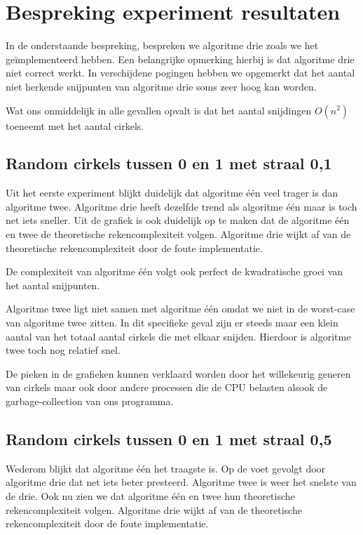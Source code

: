 \documentclass[11pt,a4paper]{article}
\begin{document}
\section{Bespreking experiment resultaten}

In de onderstaande bespreking, bespreken we algoritme drie zoals we het ge\"implementeerd hebben. Een belangrijke opmerking hierbij is dat algoritme drie niet correct werkt. In verschijdene pogingen hebben we opgemerkt dat het aantal niet herkende snijpunten van algoritme drie soms zeer hoog kan worden.

Wat ons onmiddelijk in alle gevallen opvalt is dat het aantal snijdingen $O(n^{2})$ toeneemt met het aantal cirkels.

\subsection{Random cirkels tussen 0 en 1 met straal 0,1}

Uit het eerste experiment blijkt duidelijk dat algoritme \'e\'en veel trager is dan algoritme twee. Algoritme drie heeft dezelfde trend als algoritme \'e\'en maar is toch net iets sneller. Uit de grafiek is ook duidelijk op te maken dat de algoritme \'e\'en en twee de theoretische rekencomplexiteit volgen. Algoritme drie wijkt af van de theoretische rekencomplexiteit door de foute implementatie.

De complexiteit van algoritme \'e\'en volgt ook perfect de kwadratische groei van het aantal snijpunten.

Algoritme twee ligt niet samen met algoritme \'e\'en omdat we niet in de worst-case van algoritme twee zitten. In dit specifieke geval zijn er steeds maar een klein aantal van het totaal aantal cirkels die met elkaar snijden. Hierdoor is algoritme twee toch nog relatief snel.

De pieken in de grafieken kunnen verklaard worden door het willekeurig generen van cirkels maar ook door andere processen die de CPU belasten alsook de garbage-collection van ons programma. 

\subsection{Random cirkels tussen 0 en 1 met straal 0,5}

Wederom blijkt dat algoritme \'e\'en het traagste is. Op de voet gevolgt door algoritme drie dat net iets beter presteerd. Algoritme twee is weer het snelste van de drie. Ook nu zien we dat algoritme \'e\'en en twee hun theoretische rekencomplexiteit volgen. Algoritme drie wijkt af van de theoretische rekencomplexiteit door de foute implementatie.
\end{document}
